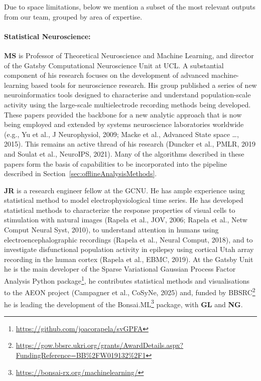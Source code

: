 Due to space limitations, below we mention a subset of the most relevant
outputs from our team, grouped by area of expertise.

\paragraph{Statistical Neuroscience:} \textbf{MS} is Professor of Theoretical
Neuroscience and Machine Learning, and director of the Gatsby Computational
Neuroscience Unit at UCL.
%
A substantial component of his research focuses on the development of advanced
machine-learning based tools for neuroscience research.
%
His group published a series of new neuroinformatics tools designed to
characterise and understand population-scale activity using the large-scale
multielectrode recording methods being developed. These papers provided the
backbone for a new analytic approach that is now being employed and extended by
systems neuroscience laboratories worldwide (e.g., Yu et al., J Neurophysiol,
2009; Macke et al., Advanced State space \ldots, 2015).
%
This remains an active thread of his research (Duncker et al., PMLR, 2019 and
Soulat et al., NeuroIPS, 2021).
%
Many of the algorithms described in these papers form the basis of capabilities
to be incorporated into the pipeline described in
Section~\ref{sec:offlineAnalysisMethods}.

\textbf{JR} is a research engineer fellow at the GCNU.
%
He has ample experience using statistical method to model electrophysiological
time series. He has developed statistical methods to characterize the response
properties of visual cells to stimulation with natural images (Rapela et al.,
JOV, 2006; Rapela et al., Netw Comput Neural Syst, 2010), to understand
attention in humans using electroencephalographic recordings (Rapela et al.,
Neural Comput, 2018), and to investigate disfunctional population activity in
epilepsy using cortical Utah array recording in the human cortex (Rapela et
al., EBMC, 2019).
%
At the Gatsby Unit he is the main developer of the Sparse Variational Gaussian
Process Factor Analysis Python
package\footnote{\url{https://github.com/joacorapela/svGPFA}}, he contributes
statistical methods and visualisations to the AEON project (Campagner et al.,
CoSyNe, 2025) and, funded by
BBSRC\footnote{\url{https://gow.bbsrc.ukri.org/grants/AwardDetails.aspx?FundingReference=BB\%2FW019132\%2F1}}
he is leading the development of the
Bonsai.ML\footnote{\url{https://bonsai-rx.org/machinelearning/}} package, with
\textbf{GL} and \textbf{NG}.

